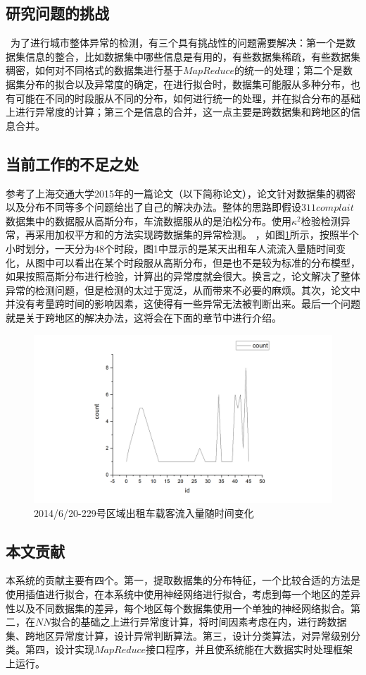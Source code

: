 \documentclass[a4paper, UTF8]{article}
\begin{document}
\begin{CJK}{UTF8}{gbsn}
\subsection{研究问题的挑战}
\ 为了进行城市整体异常的检测，有三个具有挑战性的问题需要解决：第一个是数据集信息的整合，比如数据集中哪些信息是有用的，有些数据集稀疏，有些数据集稠密，如何对不同格式的数据集进行基于$MapReduce$的统一的处理；第二个是数据集分布的拟合以及异常度的确定，在进行拟合时，数据集可能服从多种分布，也有可能在不同的时段服从不同的分布，如何进行统一的处理，并在拟合分布的基础上进行异常度的计算；第三个是信息的合并，这一点主要是跨数据集和跨地区的信息合并。
\subsection{当前工作的不足之处}
参考了上海交通大学2015年的一篇论文\cite{DalzielDetecting}（以下简称论文），论文针对数据集的稠密以及分布不同等多个问题给出了自己的解决办法。整体的思路即假设$311 complait$数据集中的数据服从高斯分布，车流数据服从的是泊松分布。使用$\kappa ^ 2$检验检测异常，再采用加权平方和的方法实现跨数据集的异常检测。
，如图\ref{figure1}所示，按照半个小时划分，一天分为48个时段，图1中显示的是某天出租车人流流入量随时间变化，从图中可以看出在某个时段服从高斯分布，但是也不是较为标准的分布模型，如果按照高斯分布进行检验，计算出的异常度就会很大。换言之，论文解决了整体异常的检测问题，但是检测的太过于宽泛，从而带来不必要的麻烦。其次，论文中并没有考量跨时间的影响因素，这使得有一些异常无法被判断出来。最后一个问题就是关于跨地区的解决办法，这将会在下面的章节中进行介绍。
\begin{figure}[ht]
\includegraphics[scale = 0.3]{flow.png}
\centering
\caption{2014/6/20-229号区域出租车载客流入量随时间变化}
\label{figure1}
\end{figure}
\subsection{本文贡献}
本系统的贡献主要有四个。第一，提取数据集的分布特征，一个比较合适的方法是使用插值进行拟合，在本系统中使用神经网络进行拟合，考虑到每一个地区的差异性以及不同数据集的差异，每个地区每个数据集使用一个单独的神经网络拟合。第二，在$NN$拟合的基础之上进行异常度计算，将时间因素考虑在内，进行跨数据集、跨地区异常度计算，设计异常判断算法。第三，设计分类算法，对异常级别分类。第四，设计实现$MapReduce$接口程序，并且使系统能在大数据实时处理框架上运行。

\end{CJK}
\end{document}
